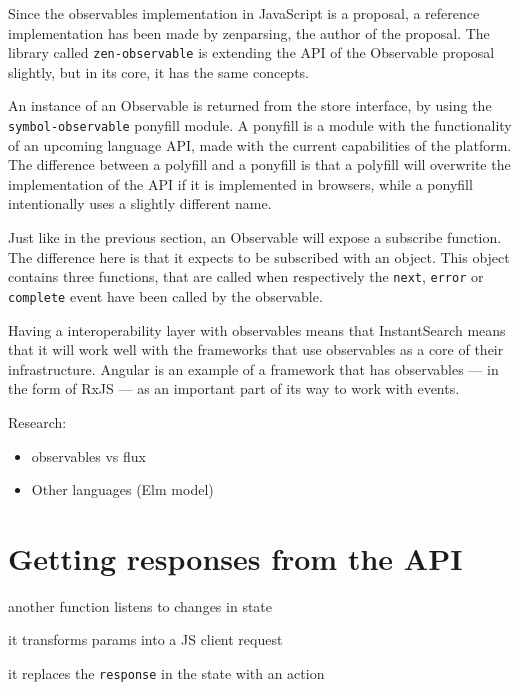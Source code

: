 Since the observables implementation in JavaScript is a proposal, a reference implementation has been made by zenparsing, the author of the proposal. The library called {\tt zen-observable}\cite{zenparsing-observable} is extending the API of the Observable proposal slightly, but in its core, it has the same concepts.

An instance of an Observable is returned from the store interface, by using the {\tt symbol-observable}\cite{symbol-observable} ponyfill module. A ponyfill\cite{ponyfill} is a module with the functionality of an upcoming language API, made with the current capabilities of the platform. The difference between a polyfill and a ponyfill is that a polyfill will overwrite the implementation of the API if it is implemented in browsers, while a ponyfill intentionally uses a slightly different name.

Just like in the previous section, an Observable will expose a subscribe function. The difference here is that it expects to be subscribed with an object. This object contains three functions, that are called when respectively the {\tt next}, {\tt error} or {\tt complete} event have been called by the observable.

Having a interoperability layer with observables means that InstantSearch means that it will work well with the frameworks that use observables as a core of their infrastructure. Angular is an example of a framework that has observables --- in the form of RxJS --- as an important part of its way to work with events.

Research:

\begin{itemize}
  \item observables vs flux
  \item Other languages (Elm model)\cite{csstricks-elm} %
\end{itemize}


\section{Getting responses from the API} %
\label{sec:getting_responses_from_the_api}

another function listens to changes in state %

it transforms params into a JS client request

it replaces the {\tt response} in the state with an action

